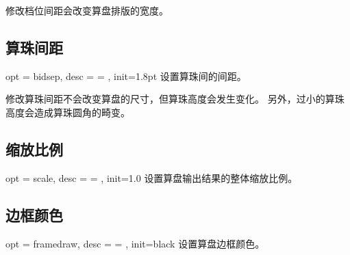 \documentclass[full]{l3doc}
\begin{document}
\begin{documentation}
  \begin{notezh}
    修改档位间距会改变算盘排版的宽度。
  \end{notezh}

\subsection{算珠间距}

\begin{option}{ opt = bidsep, desc = {= }, init=1.8pt }
  设置算珠间的间距。
\end{option}

\begin{SideBySideExample}[frame=single,numbers=left,%
                xrightmargin=.40\linewidth,gobble=2]
  \centering
  \begin{suanpan}
  \end{suanpan}
\end{SideBySideExample}

  \begin{notezh}
    修改算珠间距不会改变算盘的尺寸，但算珠高度会发生变化。
    另外，过小的算珠高度会造成算珠圆角的畸变。
  \end{notezh}

\subsection{缩放比例}

\begin{option}{ opt = scale, desc = {= }, init=1.0 }
  设置算盘输出结果的整体缩放比例。
\end{option}

\begin{SideBySideExample}[frame=single,numbers=left,%
                xrightmargin=.40\linewidth,gobble=2]
  \centering
  \begin{suanpan}
  \end{suanpan}
\end{SideBySideExample}

\subsection{边框颜色}

\begin{option}{ opt = framedraw, desc = {= }, init=black }
  设置算盘边框颜色。
\end{option}


\end{documentation}
\end{document}
